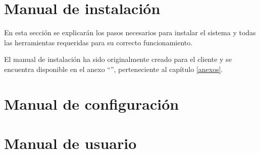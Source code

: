 \section{Manual de instalación}
En esta sección se explicarán los pasos necesarios para instalar el sistema y todas las herramientas requeridas para su correcto funcionamiento.

El manual de instalación ha sido originalmente creado para el cliente y se encuentra disponible en el anexo ``'', perteneciente al capítulo \ref{anexos}.



\section{Manual de configuración}

\section{Manual de usuario}